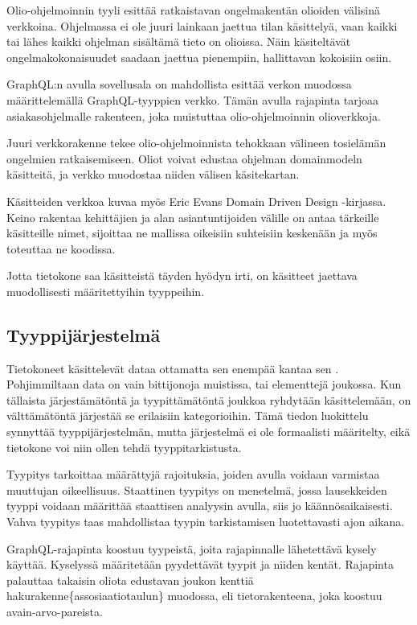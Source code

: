 Olio-ohjelmoinnin tyyli esittää ratkaistavan ongelmakentän olioiden
välisinä verkkoina. Ohjelmassa ei ole juuri lainkaan jaettua tilan
käsittelyä, vaan kaikki tai lähes kaikki ohjelman sisältämä tieto on
olioissa. Näin käsiteltävät ongelmakokonaisuudet saadaan jaettua
pienempiin, hallittavan kokoisiin osiin. \citep{booch2008object}

GraphQL:n avulla sovellusala on mahdollista esittää verkon muodossa
määrittelemällä GraphQL-tyyppien verkko. Tämän avulla rajapinta tarjoaa
asiakasohjelmalle rakenteen, joka muistuttaa olio-ohjelmoinnin
olioverkkoja. \citep{thinkingInGraphs}

Juuri verkkorakenne tekee olio-ohjelmoinnista tehokkaan välineen
tosielämän ongelmien ratkaisemiseen. Oliot voivat edustaa ohjelman
\gls{domainmodel}n käsitteitä, ja verkko muodostaa niiden välisen
käsitekartan.

Käsitteiden verkkoa kuvaa myös Eric Evans Domain Driven Design
-kirjassa. Keino rakentaa  kehittäjien ja alan
asiantuntijoiden välille on antaa tärkeille käsitteille nimet, sijoittaa
ne mallissa oikeisiin suhteisiin keskenään ja myös toteuttaa ne
koodissa.

Jotta tietokone saa käsitteistä täyden hyödyn irti, on käsitteet
jaettava muodollisesti määritettyihin tyyppeihin.

\hypertarget{tyyppijuxe4rjestelmuxe4}{%
\subsection{Tyyppijärjestelmä}\label{tyyppijuxe4rjestelmuxe4}}

Tietokoneet käsittelevät dataa ottamatta sen enempää kantaa sen
. Pohjimmiltaan data on vain bittijonoja
muistissa, tai elementtejä joukossa. Kun tällaista järjestämätöntä ja
tyypittämätöntä joukkoa ryhdytään käsittelemään, on välttämätöntä
järjestää se erilaisiin kategorioihin. Tämä tiedon luokittelu synnyttää
tyyppijärjestelmän, mutta järjestelmä ei ole formaalisti määritelty,
eikä tietokone voi niin ollen tehdä tyyppitarkistusta.

Tyypitys tarkoittaa määrättyjä rajoituksia, joiden avulla voidaan
varmistaa muuttujan oikeellisuus. Staattinen tyypitys on menetelmä,
jossa lausekkeiden tyyppi voidaan määrittää staattisen analyysin avulla,
siis jo käännösaikaisesti. Vahva tyypitys taas mahdollistaa tyypin
tarkistamisen luotettavasti ajon aikana. \citep{Cardelli+Wegner:1985}

GraphQL-rajapinta koostuu tyypeistä, joita rajapinnalle lähetettävä
kysely käyttää. Kyselyssä määritetään pyydettävät tyypit ja niiden
kentät. Rajapinta palauttaa takaisin oliota edustavan joukon kenttiä
\gls{hakurakenne}\{assosiaatiotaulun\} muodossa, eli tietorakenteena,
joka koostuu avain-arvo-pareista. \citep{graphql:spec}

